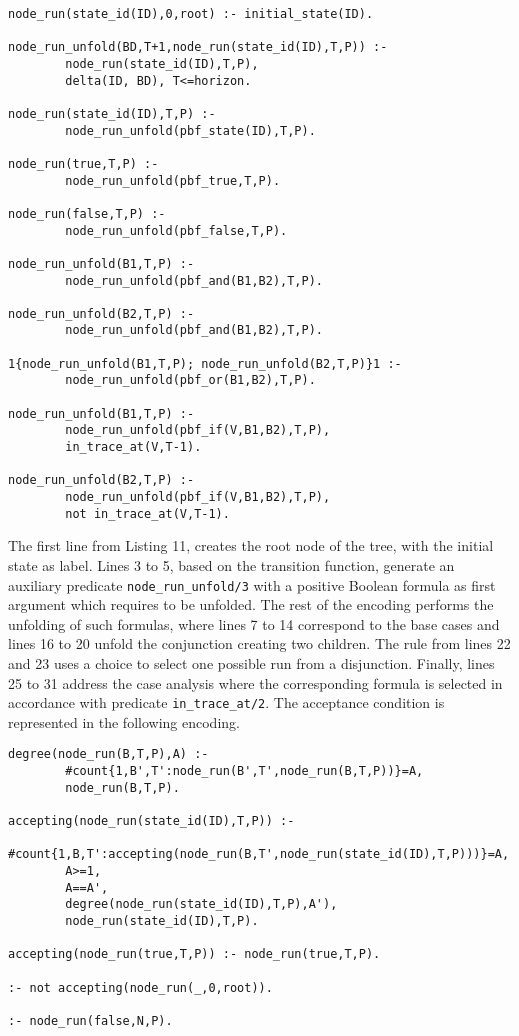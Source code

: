\begin{center}
    \begin{lstlisting}[] 
node_run(state_id(ID),0,root) :- initial_state(ID).

node_run_unfold(BD,T+1,node_run(state_id(ID),T,P)) :-  
        node_run(state_id(ID),T,P), 
        delta(ID, BD), T<=horizon.

node_run(state_id(ID),T,P) :- 
        node_run_unfold(pbf_state(ID),T,P).

node_run(true,T,P) :- 
        node_run_unfold(pbf_true,T,P).

node_run(false,T,P) :- 
        node_run_unfold(pbf_false,T,P).

node_run_unfold(B1,T,P) :- 
        node_run_unfold(pbf_and(B1,B2),T,P).

node_run_unfold(B2,T,P) :- 
        node_run_unfold(pbf_and(B1,B2),T,P).

1{node_run_unfold(B1,T,P); node_run_unfold(B2,T,P)}1 :- 
        node_run_unfold(pbf_or(B1,B2),T,P).

node_run_unfold(B1,T,P) :- 
        node_run_unfold(pbf_if(V,B1,B2),T,P), 
        in_trace_at(V,T-1).

node_run_unfold(B2,T,P) :- 
        node_run_unfold(pbf_if(V,B1,B2),T,P), 
        not in_trace_at(V,T-1).        
\end{lstlisting}
\end{center}

The first line from Listing 11, creates the root node of the tree, with the initial state as label. Lines 3 to 5, based on the transition function, generate an auxiliary predicate \texttt{node\_run\_unfold/3} with a positive Boolean formula as first argument which requires to be unfolded. The rest of the encoding performs the unfolding of such formulas, where lines 7 to 14 correspond to the base cases and lines 16 to 20 unfold the conjunction creating two children. The rule from lines 22 and 23 uses a choice to select one possible run from a disjunction. Finally, lines 25 to 31 address the case analysis where the corresponding formula is selected in accordance with predicate \texttt{in\_trace\_at/2}. The acceptance condition is represented in the following encoding.

\begin{center}
    \begin{lstlisting}[] 
degree(node_run(B,T,P),A) :-  
        #count{1,B',T':node_run(B',T',node_run(B,T,P))}=A, 
        node_run(B,T,P).

accepting(node_run(state_id(ID),T,P)) :-  
        #count{1,B,T':accepting(node_run(B,T',node_run(state_id(ID),T,P)))}=A,
        A>=1,
        A==A',
        degree(node_run(state_id(ID),T,P),A'),
        node_run(state_id(ID),T,P).

accepting(node_run(true,T,P)) :- node_run(true,T,P).

:- not accepting(node_run(_,0,root)).

:- node_run(false,N,P).
    \end{lstlisting}
\end{center}

